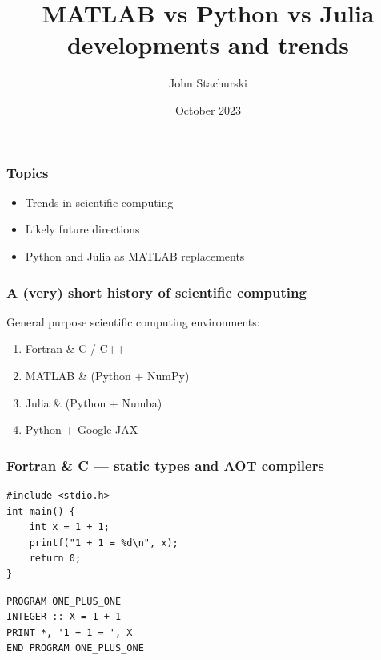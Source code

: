 \documentclass[
    xcolor={svgnames,dvipsnames},
    hyperref={colorlinks, citecolor=DeepPink4, linkcolor=DarkRed, urlcolor=DarkBlue}
    ]{beamer}  %
\title{MATLAB vs Python vs Julia \\ developments and trends}
\author{John Stachurski}
\date{October 2023}
\newcommand{\1}{\mathbbm 1}
\begin{document}
\begin{frame}
  \titlepage
\end{frame}







\begin{frame}
    \frametitle{Topics}

    \begin{itemize}
        \item Trends in scientific computing
        \vspace{0.5em}
        \item Likely future directions
        \vspace{0.5em}
        \item Python and Julia as MATLAB replacements
    \end{itemize}

\end{frame}



\begin{frame}
    \frametitle{A (very) short history of scientific computing}


    General purpose scientific computing environments:

        \vspace{0.5em}
        \vspace{0.5em}
    \begin{enumerate}
        \item Fortran \& C / C++ 
        \vspace{0.5em}
        \vspace{0.5em}
        \item MATLAB \& (Python + NumPy)
        \vspace{0.5em}
        \vspace{0.5em}
        \item Julia \& (Python + Numba) 
        \vspace{0.5em}
        \vspace{0.5em}
        \item Python + Google JAX 
    \end{enumerate}

\end{frame}



\begin{frame}[fragile]
    \frametitle{Fortran \& C --- static types and AOT compilers}

    {\small
    \begin{verbatim}
#include <stdio.h>
int main() {
    int x = 1 + 1;
    printf("1 + 1 = %d\n", x);
    return 0;
}   
    \end{verbatim}
    }


    {\small
    \begin{verbatim}
PROGRAM ONE_PLUS_ONE  
INTEGER :: X = 1 + 1 
PRINT *, '1 + 1 = ', X
END PROGRAM ONE_PLUS_ONE 
    \end{verbatim}
    }

\end{frame}
\end{document}
